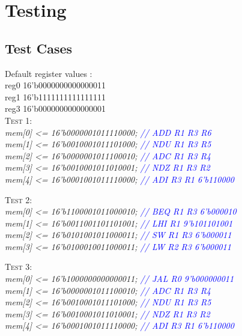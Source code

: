 \documentclass[11pt,fleqn,oneside]{book} %
\begin{document}
\chapter{Testing}

\section{Test Cases}
\vspace{1cm}
Default register values : \\
reg0        16'b0000000000000011    \\
reg1     	16'b1111111111111111	\\
reg3    	16'b0000000000000001	\\

\textsc{Test 1:} \\
\textit{
mem[0] <= 16'b0000001011110000; \textcolor{blue}{// ADD  R1  R3  R6} \\
mem[1] <= 16'b0010001011101000; \textcolor{blue}{// NDU  R1  R3  R5} \\
mem[2] <= 16'b0000001011100010;	\textcolor{blue}{// ADC  R1  R3  R4} \\
mem[3] <= 16'b0010001011010001;	\textcolor{blue}{// NDZ  R1  R3  R2} \\
mem[4] <= 16'b0001001011110000;	\textcolor{blue}{// ADI  R3  R1  6'b110000} \\
}

\vspace{1cm}

\textsc{Test 2:} \\
\textit{
mem[0] <= 16'b1100001011000010; \textcolor{blue}{// BEQ  R1  R3  6'b000010} \\
mem[1] <= 16'b0011001101101001;  \textcolor{blue}{// LHI  R1  9'b101101001} \\
mem[2] <= 16'b0101001011000011;	\textcolor{blue}{// SW  R1  R3  6'b000011} \\
mem[3] <= 16'b0100010011000011;	\textcolor{blue}{// LW  R2  R3  6'b000011} \\
}

\vspace{1cm}

\textsc{Test 3:} \\
\textit{
mem[0] <= 16'b1000000000000011; \textcolor{blue}{// JAL  R0  9'b000000011} \\
mem[1] <= 16'b0000001011100010; \textcolor{blue}{// ADC  R1  R3  R4} \\
mem[2] <= 16'b0010001011101000;	\textcolor{blue}{// NDU  R1  R3  R5} \\
mem[3] <= 16'b0010001011010001;	\textcolor{blue}{// NDZ  R1  R3  R2} \\
mem[4] <= 16'b0001001011110000;	\textcolor{blue}{// ADI  R3  R1  6'b110000} \\
}
\end{document}
